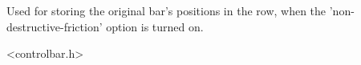 %
%


\section{}\label{cbbarshapedata}


Used for storing the original bar's positions in the row, when the 'non-destructive-friction'
option is turned on.




<controlbar.h>


